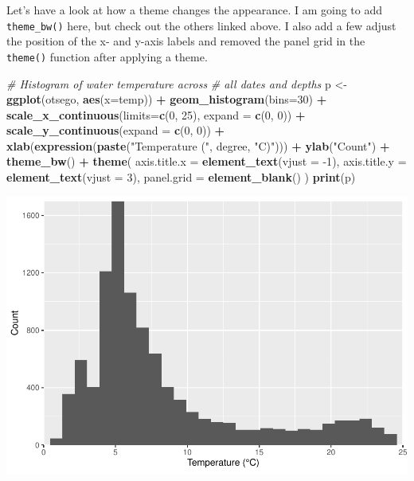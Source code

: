 \documentclass[
]{book}
\newenvironment{Shaded}{\begin{snugshade}}{\end{snugshade}}
\newcommand{\CommentTok}[1]{\textcolor[rgb]{0.56,0.35,0.01}{\textit{#1}}}
\newcommand{\DataTypeTok}[1]{\textcolor[rgb]{0.13,0.29,0.53}{#1}}
\newcommand{\DecValTok}[1]{\textcolor[rgb]{0.00,0.00,0.81}{#1}}
\newcommand{\KeywordTok}[1]{\textcolor[rgb]{0.13,0.29,0.53}{\textbf{#1}}}
\newcommand{\NormalTok}[1]{#1}
\newcommand{\OperatorTok}[1]{\textcolor[rgb]{0.81,0.36,0.00}{\textbf{#1}}}
\newcommand{\StringTok}[1]{\textcolor[rgb]{0.31,0.60,0.02}{#1}}
\begin{document}
Let's have a look at how a theme changes the appearance. I am going to add \texttt{theme\_bw()} here, but check out the others linked above. I also add a few adjust the position of the x- and y-axis labels and removed the panel grid in the \texttt{theme()} function after applying a theme.

\begin{Shaded}
\begin{Highlighting}[]
\CommentTok{# Histogram of water temperature across }
\CommentTok{# all dates and depths}
\NormalTok{p <-}\StringTok{ }\KeywordTok{ggplot}\NormalTok{(otsego, }\KeywordTok{aes}\NormalTok{(}\DataTypeTok{x=}\NormalTok{temp)) }\OperatorTok{+}\StringTok{ }
\StringTok{  }\KeywordTok{geom_histogram}\NormalTok{(}\DataTypeTok{bins=}\DecValTok{30}\NormalTok{) }\OperatorTok{+}\StringTok{ }
\StringTok{  }\KeywordTok{scale_x_continuous}\NormalTok{(}\DataTypeTok{limits=}\KeywordTok{c}\NormalTok{(}\DecValTok{0}\NormalTok{, }\DecValTok{25}\NormalTok{), }\DataTypeTok{expand =} \KeywordTok{c}\NormalTok{(}\DecValTok{0}\NormalTok{, }\DecValTok{0}\NormalTok{)) }\OperatorTok{+}\StringTok{ }
\StringTok{  }\KeywordTok{scale_y_continuous}\NormalTok{(}\DataTypeTok{expand =} \KeywordTok{c}\NormalTok{(}\DecValTok{0}\NormalTok{, }\DecValTok{0}\NormalTok{)) }\OperatorTok{+}\StringTok{ }
\StringTok{  }\KeywordTok{xlab}\NormalTok{(}\KeywordTok{expression}\NormalTok{(}\KeywordTok{paste}\NormalTok{(}\StringTok{"Temperature ("}\NormalTok{, degree, }\StringTok{"C)"}\NormalTok{))) }\OperatorTok{+}
\StringTok{  }\KeywordTok{ylab}\NormalTok{(}\StringTok{"Count"}\NormalTok{) }\OperatorTok{+}
\StringTok{  }\KeywordTok{theme_bw}\NormalTok{() }\OperatorTok{+}
\StringTok{  }\KeywordTok{theme}\NormalTok{(}
    \DataTypeTok{axis.title.x =} \KeywordTok{element_text}\NormalTok{(}\DataTypeTok{vjust =} \DecValTok{-1}\NormalTok{),}
    \DataTypeTok{axis.title.y =} \KeywordTok{element_text}\NormalTok{(}\DataTypeTok{vjust =} \DecValTok{3}\NormalTok{),}
    \DataTypeTok{panel.grid =} \KeywordTok{element_blank}\NormalTok{()}
\NormalTok{  )}
\KeywordTok{print}\NormalTok{(p)}
\end{Highlighting}
\end{Shaded}

\includegraphics{worstr_files/figure-latex/unnamed-chunk-101-1.pdf}
\end{document}
